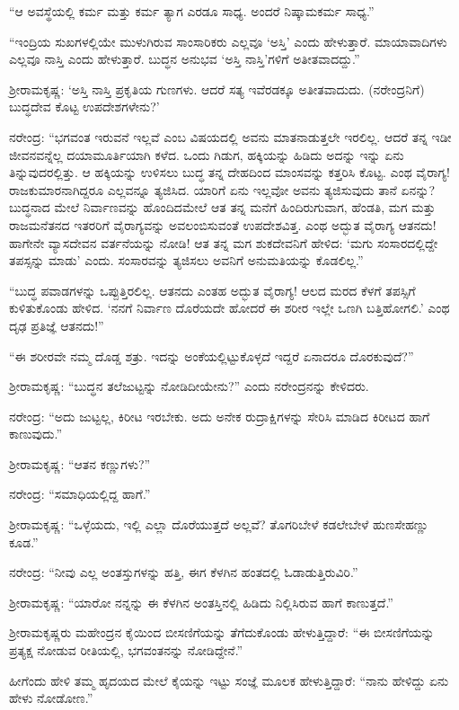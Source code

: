 “ಆ ಅವಸ್ಥೆಯಲ್ಲಿ ಕರ್ಮ ಮತ್ತು ಕರ್ಮ ತ್ಯಾಗ ಎರಡೂ ಸಾಧ್ಯ. ಅಂದರೆ ನಿಷ್ಕಾಮಕರ್ಮ ಸಾಧ್ಯ.”

“ಇಂದ್ರಿಯ ಸುಖಗಳಲ್ಲಿಯೇ ಮುಳುಗಿರುವ ಸಾಂಸಾರಿಕರು ಎಲ್ಲವೂ ‘ಅಸ್ತಿ’ ಎಂದು ಹೇಳುತ್ತಾರೆ. ಮಾಯಾವಾದಿಗಳು ಎಲ್ಲವೂ ನಾಸ್ತಿ ಎಂದು ಹೇಳುತ್ತಾರೆ. ಬುದ್ಧನ ಅನುಭವ ‘ಅಸ್ತಿ ನಾಸ್ತಿ’ಗಳಿಗೆ ಅತೀತವಾದದ್ದು.”

ಶ‍್ರೀರಾಮಕೃಷ್ಣ: ‘ಅಸ್ತಿ ನಾಸ್ತಿ ಪ್ರಕೃತಿಯ ಗುಣಗಳು. ಆದರೆ ಸತ್ಯ ಇವೆರಡಕ್ಕೂ ಅತೀತವಾದುದು. (ನರೇಂದ್ರನಿಗೆ) ಬುದ್ಧದೇವ ಕೊಟ್ಟ ಉಪದೇಶಗಳೇನು?’

ನರೇಂದ್ರ: “ಭಗವಂತ ಇರುವನೆ ಇಲ್ಲವೆ ಎಂಬ ವಿಷಯದಲ್ಲಿ ಅವನು ಮಾತನಾಡುತ್ತಲೇ ಇರಲಿಲ್ಲ. ಆದರೆ ತನ್ನ ಇಡೀ ಜೀವನವನ್ನೆಲ್ಲ ದಯಾಮೂರ್ತಿಯಾಗಿ ಕಳೆದ. ಒಂದು ಗಿಡುಗ, ಹಕ್ಕಿಯನ್ನು ಹಿಡಿದು ಅದನ್ನು ಇನ್ನು ಏನು ತಿನ್ನುವುದರಲ್ಲಿತ್ತು. ಆ ಹಕ್ಕಿಯನ್ನು ಉಳಿಸಲು ಬುದ್ಧ ತನ್ನ ದೇಹದಿಂದ ಮಾಂಸವನ್ನು ಕತ್ತರಿಸಿ ಕೊಟ್ಟ. ಎಂಥ ವೈರಾಗ್ಯ! ರಾಜಕುಮಾರನಾಗಿದ್ದರೂ ಎಲ್ಲವನ್ನೂ ತ್ಯಜಿಸಿದ. ಯಾರಿಗೆ ಏನು ಇಲ್ಲವೋ ಅವನು ತ್ಯಜಿಸುವುದು ತಾನೆ ಏನನ್ನು? ಬುದ್ಧನಾದ ಮೇಲೆ ನಿರ್ವಾಣವನ್ನು ಹೊಂದಿದಮೇಲೆ ಆತ ತನ್ನ ಮನೆಗೆ ಹಿಂದಿರುಗುವಾಗ, ಹೆಂಡತಿ, ಮಗ ಮತ್ತು ರಾಜಮನೆತನದ ಇತರರಿಗೆ ವೈರಾಗ್ಯವನ್ನು ಅವಲಂಬಿಸುವಂತೆ ಉಪದೇಶವಿತ್ತ. ಎಂಥ ಅದ್ಭುತ ವೈರಾಗ್ಯ ಆತನದು! ಹಾಗೇನೇ ವ್ಯಾಸದೇವನ ವರ್ತನೆಯನ್ನು ನೋಡಿ! ಆತ ತನ್ನ ಮಗ ಶುಕದೇವನಿಗೆ ಹೇಳಿದ: ‘ಮಗು ಸಂಸಾರದಲ್ಲಿದ್ದೇ ತಪಸ್ಸನ್ನು ಮಾಡು’ ಎಂದು. ಸಂಸಾರವನ್ನು ತ್ಯಜಿಸಲು ಅವನಿಗೆ ಅನುಮತಿಯನ್ನು ಕೊಡಲಿಲ್ಲ.”

“ಬುದ್ಧ ಪವಾಡಗಳನ್ನು ಒಪ್ಪುತ್ತಿರಲಿಲ್ಲ. ಆತನದು ಎಂತಹ ಅದ್ಭುತ ವೈರಾಗ್ಯ! ಆಲದ ಮರದ ಕೆಳಗೆ ತಪಸ್ಸಿಗೆ ಕುಳಿತುಕೊಂಡು ಹೇಳಿದ. ‘ನನಗೆ ನಿರ್ವಾಣ ದೊರೆಯದೇ ಹೋದರೆ ಈ ಶರೀರ ಇಲ್ಲೇ ಒಣಗಿ ಬತ್ತಿಹೋಗಲಿ.’ ಎಂಥ ದೃಢ ಪ್ರತಿಜ್ಞೆ ಆತನದು!”

“ಈ ಶರೀರವೇ ನಮ್ಮ ದೊಡ್ಡ ಶತ್ರು. ಇದನ್ನು ಅಂಕೆಯಲ್ಲಿಟ್ಟುಕೊಳ್ಳದೆ ಇದ್ದರೆ ಏನಾದರೂ ದೊರಕುವುದೆ?”

\newpage

ಶ‍್ರೀರಾಮಕೃಷ್ಣ: “ಬುದ್ಧನ ತಲೆಜುಟ್ಟನ್ನು ನೋಡಿದೀಯೇನು?” ಎಂದು ನರೇಂದ್ರನನ್ನು ಕೇಳಿದರು.

ನರೇಂದ್ರ: “ಅದು ಜುಟ್ಟಲ್ಲ, ಕಿರೀಟ ಇರಬೇಕು. ಅದು ಅನೇಕ ರುದ್ರಾಕ್ಷಿಗಳನ್ನು ಸೇರಿಸಿ ಮಾಡಿದ ಕಿರೀಟದ ಹಾಗೆ ಕಾಣುವುದು.”

ಶ‍್ರೀರಾಮಕೃಷ್ಣ: “ಆತನ ಕಣ್ಣುಗಳು?”

ನರೇಂದ್ರ: “ಸಮಾಧಿಯಲ್ಲಿದ್ದ ಹಾಗೆ.”

ಶ‍್ರೀರಾಮಕೃಷ್ಣ: “ಒಳ್ಳೆಯದು, ಇಲ್ಲಿ ಎಲ್ಲಾ ದೊರೆಯುತ್ತದೆ ಅಲ್ಲವೆ? ತೊಗರಿಬೇಳೆ ಕಡಲೇಬೇಳೆ ಹುಣಸೇಹಣ್ಣು ಕೂಡ.”

ನರೇಂದ್ರ: “ನೀವು ಎಲ್ಲ ಅಂತಸ್ತುಗಳನ್ನು ಹತ್ತಿ, ಈಗ ಕೆಳಗಿನ ಹಂತದಲ್ಲಿ ಓಡಾಡುತ್ತಿರುವಿರಿ.”

ಶ‍್ರೀರಾಮಕೃಷ್ಣ: “ಯಾರೋ ನನ್ನನ್ನು ಈ ಕೆಳಗಿನ ಅಂತಸ್ತಿನಲ್ಲಿ ಹಿಡಿದು ನಿಲ್ಲಿಸಿರುವ ಹಾಗೆ ಕಾಣುತ್ತದೆ.”

ಶ‍್ರೀರಾಮಕೃಷ್ಣರು ಮಹೇಂದ್ರನ ಕೈಯಿಂದ ಬೀಸಣಿಗೆಯನ್ನು ತೆಗೆದುಕೊಂಡು ಹೇಳುತ್ತಿದ್ದಾರೆ: “ಈ ಬೀಸಣಿಗೆಯನ್ನು ಪ್ರತ್ಯಕ್ಷ ನೋಡುವ ರೀತಿಯಲ್ಲಿ, ಭಗವಂತನನ್ನು ನೋಡಿದ್ದೇನೆ.”

ಹೀಗೆಂದು ಹೇಳಿ ತಮ್ಮ ಹೃದಯದ ಮೇಲೆ ಕೈಯನ್ನು ಇಟ್ಟು ಸಂಜ್ಞೆ ಮೂಲಕ ಹೇಳುತ್ತಿದ್ದಾರೆ: “ನಾನು ಹೇಳಿದ್ದು ಏನು ಹೇಳು ನೋಡೋಣ.”

